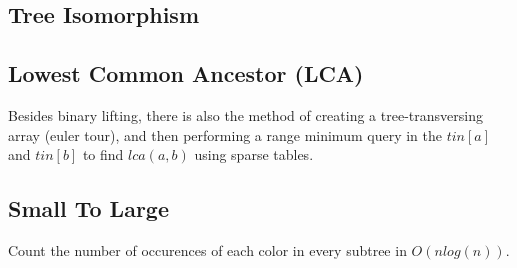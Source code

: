 
\subsection{Tree Isomorphism}


\subsection{Lowest Common Ancestor (LCA)}
	Besides binary lifting, there is also the method of creating a tree-transversing array (euler tour),
	and then performing a range minimum query in the $tin[a]$ and $tin[b]$ to find $lca(a, b)$ using sparse tables.



\subsection{Small To Large}

	Count the number of occurences of each color in every subtree in $O(n log(n))$.

